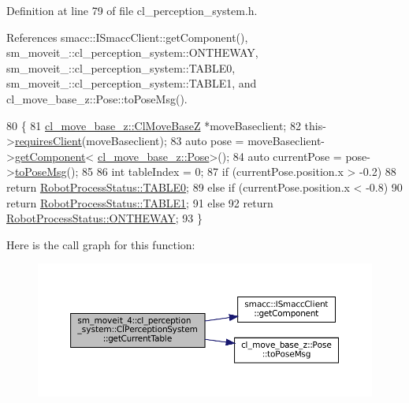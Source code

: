 Definition at line 79 of file cl\+\_\+perception\+\_\+system.\+h.



References smacc\+::\+I\+Smacc\+Client\+::get\+Component(), sm\+\_\+moveit\+\_\+::cl\+\_\+perception\+\_\+system\+::\+O\+N\+T\+H\+E\+W\+AY, sm\+\_\+moveit\+\_\+::cl\+\_\+perception\+\_\+system\+::\+T\+A\+B\+L\+E0, sm\+\_\+moveit\+\_\+::cl\+\_\+perception\+\_\+system\+::\+T\+A\+B\+L\+E1, and cl\+\_\+move\+\_\+base\+\_\+z\+::\+Pose\+::to\+Pose\+Msg().


\begin{DoxyCode}
80             \{
81                 \hyperlink{classcl__move__base__z_1_1ClMoveBaseZ}{cl\_move\_base\_z::ClMoveBaseZ} *moveBaseclient;
82                 this->\hyperlink{classsmacc_1_1ISmaccClient_a7a9990a2f3e35d547671188d69fee520}{requiresClient}(moveBaseclient);
83                 \textcolor{keyword}{auto} pose = moveBaseclient->\hyperlink{classsmacc_1_1ISmaccClient_adef78db601749ca63c19e74a27cb88cc}{getComponent}<
      \hyperlink{classcl__move__base__z_1_1Pose}{cl\_move\_base\_z::Pose}>();
84                 \textcolor{keyword}{auto} currentPose = pose->\hyperlink{classcl__move__base__z_1_1Pose_a9faf8c6b437ff6b19c8bddd692908dca}{toPoseMsg}();
85 
86                 \textcolor{keywordtype}{int} tableIndex = 0;
87                 \textcolor{keywordflow}{if} (currentPose.position.x > -0.2)
88                     \textcolor{keywordflow}{return} \hyperlink{namespacesm__moveit__4_1_1cl__perception__system_a11dfa58fc66f2d368b894a9f1fec870ea1fd65c0ced0ead229bf6dd6a59067a4f}{RobotProcessStatus::TABLE0};
89                 \textcolor{keywordflow}{else} \textcolor{keywordflow}{if} (currentPose.position.x < -0.8)
90                     \textcolor{keywordflow}{return} \hyperlink{namespacesm__moveit__4_1_1cl__perception__system_a11dfa58fc66f2d368b894a9f1fec870ea5b22e42e5d94a94037a4486a4976c49d}{RobotProcessStatus::TABLE1};
91                 \textcolor{keywordflow}{else}
92                     \textcolor{keywordflow}{return} \hyperlink{namespacesm__moveit__4_1_1cl__perception__system_a11dfa58fc66f2d368b894a9f1fec870ea92f7ea3097b3fdb1b7a25669cfc1b8bd}{RobotProcessStatus::ONTHEWAY};
93             \}
\end{DoxyCode}
Here is the call graph for this function\+:
\nopagebreak
\begin{figure}[H]
\begin{center}
\leavevmode
\includegraphics[width=350pt]{classsm__moveit__4_1_1cl__perception__system_1_1ClPerceptionSystem_aa08e0d656ca31a618c0a4c496afe36af_cgraph}
\end{center}
\end{figure}
